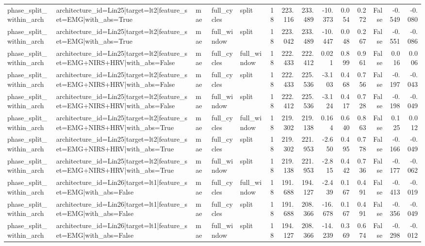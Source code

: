 \begin{table}
\begin{tabular}{lllllrrrrrrrrr}
phase_split_within_arch & architecture_id=Lin25|target=lt2|feature_set=EMG|with_abs=True & mae & full_cycles & split & 18 & 223.116 & 233.489 & -10.373 & 0.054 & 0.272 & False & -0.549 & -0.080 \\
phase_split_within_arch & architecture_id=Lin25|target=lt2|feature_set=EMG|with_abs=True & mae & full_window & split & 18 & 223.042 & 233.489 & -10.447 & 0.048 & 0.267 & False & -0.551 & -0.086 \\
phase_split_within_arch & architecture_id=Lin25|target=lt2|feature_set=EMG+NIRS+HRV|with_abs=False & mae & full_cycles & full_window & 18 & 222.433 & 222.412 & 0.021 & 0.899 & 0.961 & False & 0.016 & 0.006 \\
phase_split_within_arch & architecture_id=Lin25|target=lt2|feature_set=EMG+NIRS+HRV|with_abs=False & mae & full_cycles & split & 18 & 222.433 & 225.536 & -3.103 & 0.468 & 0.756 & False & -0.197 & -0.043 \\
phase_split_within_arch & architecture_id=Lin25|target=lt2|feature_set=EMG+NIRS+HRV|with_abs=False & mae & full_window & split & 18 & 222.412 & 225.536 & -3.124 & 0.417 & 0.728 & False & -0.198 & -0.049 \\
phase_split_within_arch & architecture_id=Lin25|target=lt2|feature_set=EMG+NIRS+HRV|with_abs=True & mae & full_cycles & full_window & 18 & 219.302 & 219.138 & 0.164 & 0.640 & 0.863 & False & 0.125 & 0.012 \\
phase_split_within_arch & architecture_id=Lin25|target=lt2|feature_set=EMG+NIRS+HRV|with_abs=True & mae & full_cycles & split & 18 & 219.302 & 221.953 & -2.650 & 0.495 & 0.778 & False & -0.166 & -0.049 \\
phase_split_within_arch & architecture_id=Lin25|target=lt2|feature_set=EMG+NIRS+HRV|with_abs=True & mae & full_window & split & 18 & 219.138 & 221.953 & -2.815 & 0.442 & 0.736 & False & -0.177 & -0.062 \\
phase_split_within_arch & architecture_id=Lin26|target=lt1|feature_set=EMG|with_abs=False & mae & full_cycles & full_window & 18 & 191.688 & 194.127 & -2.439 & 0.167 & 0.491 & False & -0.413 & -0.019 \\
phase_split_within_arch & architecture_id=Lin26|target=lt1|feature_set=EMG|with_abs=False & mae & full_cycles & split & 18 & 191.688 & 208.366 & -16.678 & 0.167 & 0.491 & False & -0.356 & -0.049 \\
phase_split_within_arch & architecture_id=Lin26|target=lt1|feature_set=EMG|with_abs=False & mae & full_window & split & 18 & 194.127 & 208.366 & -14.239 & 0.369 & 0.674 & False & -0.298 & -0.012 \\

\end{tabular}
\end{table}
